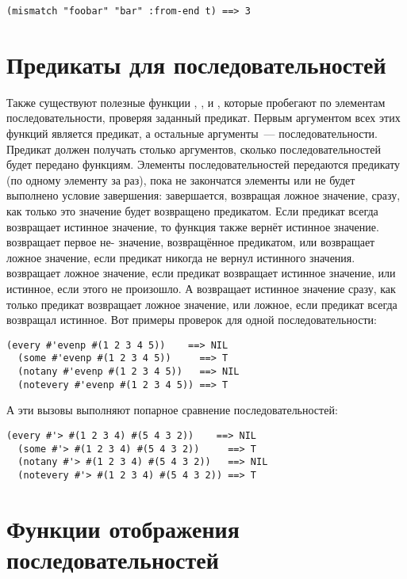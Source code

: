 \begin{lstlisting}[style=lisprepl]
  (mismatch "foobar" "bar" :from-end t) ==> 3
\end{lstlisting}

\section{Предикаты для последовательностей}

Также существуют полезные функции , ,  и
, которые пробегают по элементам последовательности, проверяя заданный
предикат.  Первым аргументом всех этих функций является предикат, а остальные аргументы~---
последовательности.  Предикат должен получать столько аргументов, сколько
последовательностей будет передано функциям.  Элементы последовательностей передаются
предикату (по одному элементу за раз), пока не закончатся элементы или не будет выполнено
условие завершения:  завершается, возвращая ложное значение, сразу, как только это
значение будет возвращено предикатом.  Если предикат всегда возвращает истинное значение,
то функция также вернёт истинное значение.   возвращает первое не-
значение, возвращённое предикатом, или возвращает ложное значение, если предикат никогда
не вернул истинного значения.  возвращает ложное значение, если предикат
возвращает истинное значение, или истинное, если этого не произошло.  А 
возвращает истинное значение сразу, как только предикат возвращает ложное значение, или
ложное, если предикат всегда возвращал истинное.  Вот примеры проверок для одной
последовательности:

\begin{lstlisting}[style=lisprepl]
  (every #'evenp #(1 2 3 4 5))    ==> NIL
  (some #'evenp #(1 2 3 4 5))     ==> T
  (notany #'evenp #(1 2 3 4 5))   ==> NIL
  (notevery #'evenp #(1 2 3 4 5)) ==> T
\end{lstlisting}

А эти вызовы выполняют попарное сравнение последовательностей:

\begin{lstlisting}[style=lisprepl]
  (every #'> #(1 2 3 4) #(5 4 3 2))    ==> NIL
  (some #'> #(1 2 3 4) #(5 4 3 2))     ==> T
  (notany #'> #(1 2 3 4) #(5 4 3 2))   ==> NIL
  (notevery #'> #(1 2 3 4) #(5 4 3 2)) ==> T
\end{lstlisting}

\section{Функции отображения последовательностей}

